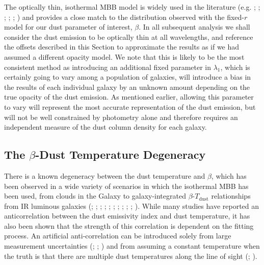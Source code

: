 The optically thin, isothermal MBB model is widely used in the literature (e.g. \citealt{Magdis_2012}; \citealt{Simpson_2017}; \citealt{Lamperti_2019}; \citealt{Dudzeviciute_2020}; \citealt{Valentino_2020a}; \citealt{daCunha_2021}) and provides a close match to the distribution observed with the fixed-$r$ model for our dust parameter of interest, $\beta$. In all subsequent analysis we shall consider the dust emission to be optically thin at all wavelengths, and reference the offsets described in this Section to approximate the results as if we had assumed a different opacity model. We note that this is likely to be the most consistent method as introducing an additional fixed parameter in $\lambda_1$, which is certainly going to vary among a population of galaxies, will introduce a bias in the results of each individual galaxy by an unknown amount depending on the true opacity of the dust emission. As mentioned earlier, allowing this parameter to vary will represent the most accurate representation of the dust emission, but will not be well constrained by photometry alone and therefore requires an independent measure of the dust column density for each galaxy.

\subsection{The $\beta$-Dust Temperature Degeneracy}

There is a known degeneracy between the dust temperature and $\beta$, which has been observed in a wide variety of scenarios in which the isothermal MBB has been used, from clouds in the Galaxy to galaxy-integrated $\beta$-$T_{\textrm{dust}}$ relationships from IR luminous galaxies (\citealt{Dupac_2003}; \citealt{Desert_2008}; \citealt{Paradis_2010}; \citealt{Schnee_2010}; \citealt{Veneziani_2010}; \citealt{Bracco_2011}; \citealt{Galametz_2012}; \citealt{Paladini_2012}; \citealt{Smith_2012}; \citealt{Lamperti_2019}; \citealt{daCunha_2021}).  While many studies have reported an anticorrelation between the dust emissivity index and dust temperature, it has also been shown that the strength of this correlation is dependent on the fitting process. An artificial anti-correlation can be introduced solely from large measurement uncertainties (\citealt{Shetty_2009a}; \citealt{Kelly_2012}; \citealt{Juvela_2012a}) and from assuming a constant temperature when the truth is that there are multiple dust temperatures along the line of sight (\citealt{Shetty_2009b}; \citealt{Juvela_2012b}).

